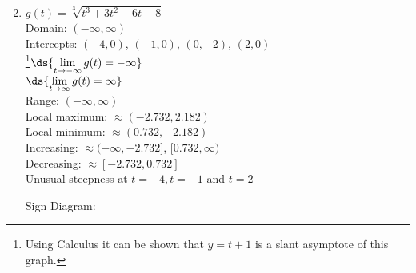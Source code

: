 \documentclass{ximera}
\begin{document}
\begin{enumerate}
\begin{multicols}{2}
\end{multicols}

\item \begin{multicols}{2} 
$g(t) = \sqrt[3]{t^{3} + 3t^{2} - 6t - 8}$\\
Domain: $(-\infty, \infty)$\\
Intercepts:  $(-4,0)$, $(-1,0)$, $(0,-2)$, $(2,0)$\\
\footnote{Using Calculus it can be shown that $y = t + 1$ is a slant asymptote of this graph.}$\ds{\lim_{t \rightarrow -\infty} g(t) = -\infty}$\\
$\ds{\lim_{t \rightarrow \infty} g(t) = \infty}$\\
Range:  $(-\infty, \infty)$\\
Local maximum:  $\approx (-2.732, 2.182)$\\
Local minimum:  $\approx (0.732, -2.182)$\\
Increasing:  $\approx (-\infty, -2.732]$, $[0.732, \infty)$\\
Decreasing: $\approx [-2.732, 0.732]$\\
Unusual steepness at $t = -4, t = -1$ and $t = 2$\\

\columnbreak


Sign Diagram:\\

% 





\end{multicols}
\end{enumerate}
\end{document}
